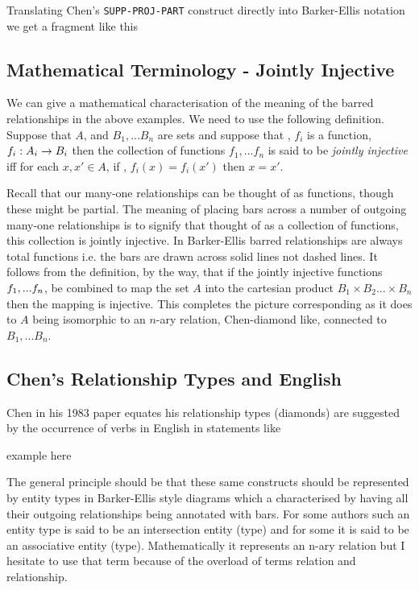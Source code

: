\mynote 
Translating Chen's \verb'SUPP-PROJ-PART' construct directly into Barker-Ellis notation we get a fragment like this
\begin{center}
\scalebox{0.95}{}
\end{center}


\subsection{Mathematical Terminology - Jointly Injective}
\label{JointlyInjective}
\mynote
We can give a mathematical characterisation of the meaning of the barred relationships in the above examples.
We need to use the following definition.
Suppose that $A$, and $B_1,...B_n$ are sets and suppose that \foreachi, $f_i$ is a function, $f_i:A_i \rightarrow B_i$ 
then the collection of functions $f_1,...f_n$ is said to be \textit{jointly injective}
iff for each $x,x' \in A$, if \foreachi, $f_i(x)=f_i(x')$ then $x=x'$.

Recall that our many-one relationships can be thought of as functions, though these might be partial.
The meaning of placing bars across a number of outgoing many-one relationships is to signify that thought of as a collection of functions, this collection is jointly injective. In Barker-Ellis barred relationships are always total functions i.e. the bars are drawn across solid lines not dashed lines.
\mynote
It follows from the definition, by the way, that if the jointly injective functions $f_1,...f_n$, be combined
to map the set $A$ into the cartesian product $B_1 \times B_2 ... \times B_n$
then the mapping is injective. This completes the picture corresponding as it does to $A$ being isomorphic to an $n$-ary relation,
Chen-diamond like, connected to $B_1,...B_n$.

\subsection{Chen's Relationship Types and English}
\mynote
Chen in his 1983 paper equates his relationship types (diamonds) are suggested by
the occurrence of verbs in English in statements like
\begin{center}
example here
\end{center}

The general principle should be that these same constructs should be 
represented by entity types in Barker-Ellis style diagrams which a characterised by having
all their outgoing relationships being  annotated with bars.
For some authors such an entity type is said to be an intersection entity (type)
and for some it is said to be an associative entity (type). Mathematically it represents an n-ary relation but I hesitate to use that term because of the overload of terms relation and relationship. 




